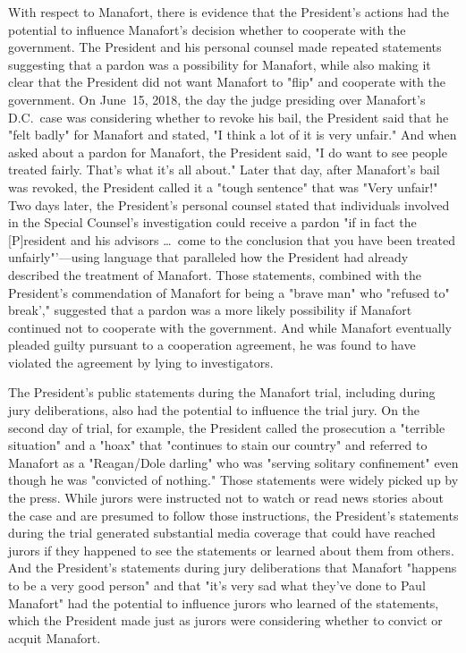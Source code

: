 With respect to Manafort, there is evidence that the President's actions had the potential to influence Manafort's decision whether to cooperate with the government.
The President and his personal counsel made repeated statements suggesting that a pardon was a possibility for Manafort, while also making it clear that the President did not want Manafort to "flip" and cooperate with the government.
On June~15, 2018, the day the judge presiding over Manafort's D.C.~case was considering whether to revoke his bail, the President said that he "felt badly" for Manafort and stated, "I think a lot of it is very unfair."
And when asked about a pardon for Manafort, the President said, "I do want to see people treated fairly.
That's what it's all about." Later that day, after Manafort's bail was revoked, the President called it a "tough sentence" that was "Very unfair!"
Two days later, the President's personal counsel stated that individuals involved in the Special Counsel's investigation could receive a pardon "if in fact the [P]resident and his advisors \dots\ come to the conclusion that you have been treated unfairly"'---using language that paralleled how the President had already described the treatment of Manafort.
Those statements, combined with the President's commendation of Manafort for being a "brave man" who "refused to" break'," suggested that a pardon was a more likely possibility if Manafort continued not to cooperate with the government.
And while Manafort eventually pleaded guilty pursuant to a cooperation agreement, he was found to have violated the agreement by lying to investigators.

The President's public statements during the Manafort trial, including during jury deliberations, also had the potential to influence the trial jury.
On the second day of trial, for example, the President called the prosecution a "terrible situation" and a "hoax" that "continues to stain our country" and referred to Manafort as a "Reagan/Dole darling" who was "serving solitary confinement" even though he was "convicted of nothing."
Those statements were widely picked up by the press.
While jurors were instructed not to watch or read news stories about the case and are presumed to follow those instructions, the President's statements during the trial generated substantial media coverage that could have reached jurors if they happened to see the statements or learned about them from others.
And the President's statements during jury deliberations that Manafort "happens to be a very good person" and that "it's very sad what they've done to Paul Manafort" had the potential to influence jurors who learned of the statements, which the President made just as jurors were considering whether to convict or acquit Manafort.

